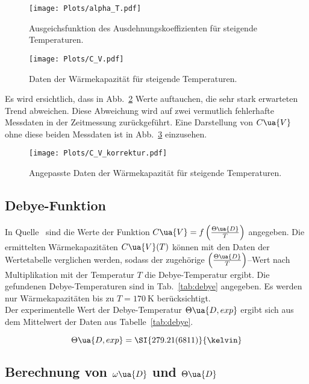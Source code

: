 \begin{figure}[h]
  \centering
  \texttt{[image: Plots/alpha\_T.pdf]}
  \caption{Ausgeichsfunktion des Ausdehnungskoeffizienten für steigende Temperaturen.}
  \label{fig:alpha}
\end{figure}

\begin{figure}
  \centering
  \texttt{[image: Plots/C\_V.pdf]}
  \caption{Daten der Wärmekapazität für steigende Temperaturen.}
  \label{fig:c_v}
\end{figure}
\FloatBarrier
Es wird ersichtlich, dass in Abb.~\ref{fig:c_v} Werte auftauchen, die sehr
stark erwarteten Trend abweichen.
Diese Abweichung wird auf zwei vermutlich fehlerhafte Messdaten in der Zeitmessung zurückgeführt.
Eine Darstellung von $C\ua{V}$ ohne diese beiden Messdaten ist in Abb.~\ref{fig:c_v_korrektur}
einzusehen.

\begin{figure}
  \centering
  \texttt{[image: Plots/C\_V\_korrektur.pdf]}
  \caption{Angepasste Daten der Wärmekapazität für steigende Temperaturen.}
  \label{fig:c_v_korrektur}
\end{figure}

\subsection{Debye-Funktion}

In Quelle~\cite{anleitung} sind die Werte der Funktion $C\ua{V} = f\left(\frac{\Theta\ua{D}}{T}\right)$
angegeben. Die ermittelten Wärmekapazitäten $C\ua{V}(T)$ können
mit den Daten der Wertetabelle verglichen werden, sodass
der zugehörige $\left(\frac{\Theta\ua{D}}{T}\right)$--Wert nach Multiplikation
mit der Temperatur $T$ die Debye-Temperatur ergibt.
Die gefundenen Debye-Temperaturen sind in Tab.~\ref{tab:debye} angegeben.
Es werden nur Wärmekapazitäten bis zu $T = \SI{170}{\kelvin}$ berücksichtigt.\\
Der experimentelle Wert der Debye-Temperatur $\Theta\ua{D, exp}$ ergibt sich aus dem Mittelwert
der Daten aus Tabelle~\ref{tab:debye}.

\begin{equation}
  \label{eqn:debye}
  \Theta\ua{D, exp} = \SI{279.21(6811)}{\kelvin}
\end{equation}

\subsection{Berechnung von $\omega\ua{D}$ und $\Theta\ua{D}$}

